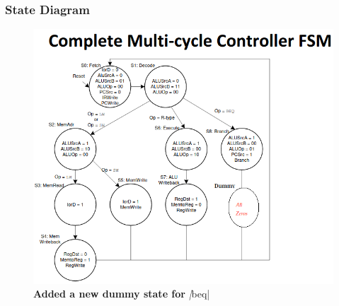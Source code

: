 \documentclass{article}
\begin{document}
\subsubsection*{State Diagram}
\begin{figure}[H]
    \begin{center}
        \includegraphics[scale=0.5]{MultiCycleImplementation/MIPsMulticylce_FSM.png}
        \caption*{\textbf{Added a new dummy state for }\textit|beq|}
    \end{center}
\end{figure}
\end{document}
